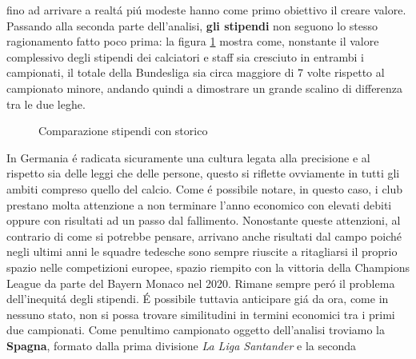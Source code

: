 \documentclass[
    corpo=12pt,
    oneside,
    evenboxes,
    tipotesi=triennale,
    stile=classica,
    oldstyle,
    autoretitolo,
    greek,
]{toptesi}
\begin{document}
\begin{interlinea}{1.5}
fino ad arrivare a realt\'a pi\'u modeste hanno come primo obiettivo il creare valore.\newline
Passando alla seconda parte dell'analisi, \textbf{gli stipendi} non seguono lo stesso \linebreak ragionamento fatto poco prima: la figura 
\ref{comparazione_stipendi_germania} mostra come, nonstante il valore complessivo degli stipendi dei calciatori e staff sia cresciuto in entrambi
i campionati, il totale della Bundesliga sia circa maggiore di 7 volte rispetto al campionato minore, andando quindi a dimostrare
un grande scalino di differenza tra le due leghe.
\begin{figure}
    \centering
     \quad
    \caption{Comparazione stipendi con storico}
    \label{comparazione_stipendi_germania}  
\end{figure}
In Germania \'e radicata sicuramente una cultura legata alla precisione e al rispetto sia delle leggi che delle persone, questo si riflette 
ovviamente in tutti gli ambiti compreso quello del calcio. Come \'e possibile notare, in questo caso, i club prestano molta attenzione a non 
terminare l'anno economico con elevati debiti oppure con risultati ad un passo dal fallimento. Nonostante queste attenzioni, al contrario
di come si potrebbe pensare, arrivano anche risultati dal campo poich\'e negli ultimi anni le squadre tedesche sono sempre riuscite a ritagliarsi 
il proprio spazio nelle competizioni europee, spazio riempito con la vittoria della Champions League da parte del Bayern Monaco nel 2020. 
Rimane sempre per\'o il problema dell'inequit\'a degli stipendi. \'E possibile tuttavia anticipare gi\'a da ora, come in nessuno stato, non si possa
trovare similitudini in termini economici tra i primi due campionati.\newline
Come penultimo campionato oggetto dell'analisi troviamo la \textbf{Spagna}, formato dalla prima divisione \emph{La Liga Santander} e la seconda

\end{interlinea}
\end{document}
